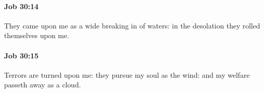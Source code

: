 		\paragraph{Job 30:14} %
			\label{JOB-30-14}

			They came upon me as a wide breaking in of waters: in the desolation they rolled themselves upon me.


		\paragraph{Job 30:15} %
			\label{JOB-30-15}

			Terrors are turned upon me: they pursue my soul as the wind: and my welfare passeth away as a cloud.


